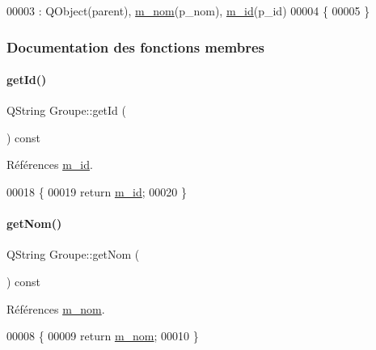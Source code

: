 \begin{DoxyCode}
00003                                                            : QObject(parent), 
      \hyperlink{class_groupe_ad76b271599f46c8a350f8afa3bc884c5}{m\_nom}(p\_nom), \hyperlink{class_groupe_ae837f3752cea27d8ab7678d4d1e4a764}{m\_id}(p\_id)
00004 \{
00005 \}
\end{DoxyCode}


\subsubsection{Documentation des fonctions membres}
\mbox{\label{class_groupe_aadab27e8d3f4a050a7bc4ae23c95efa7}} 
\paragraph{\texorpdfstring{get\+Id()}{getId()}}
{\footnotesize\ttfamily Q\+String Groupe\+::get\+Id (\begin{DoxyParamCaption}{ }\end{DoxyParamCaption}) const}



Références \hyperlink{class_groupe_ae837f3752cea27d8ab7678d4d1e4a764}{m\+\_\+id}.


\begin{DoxyCode}
00018 \{
00019     \textcolor{keywordflow}{return} \hyperlink{class_groupe_ae837f3752cea27d8ab7678d4d1e4a764}{m\_id};
00020 \}
\end{DoxyCode}
\mbox{\label{class_groupe_a88bf0b7a0e69d549fa3fdb1b01c0de2c}} 
\paragraph{\texorpdfstring{get\+Nom()}{getNom()}}
{\footnotesize\ttfamily Q\+String Groupe\+::get\+Nom (\begin{DoxyParamCaption}{ }\end{DoxyParamCaption}) const}



Références \hyperlink{class_groupe_ad76b271599f46c8a350f8afa3bc884c5}{m\+\_\+nom}.


\begin{DoxyCode}
00008 \{
00009     \textcolor{keywordflow}{return} \hyperlink{class_groupe_ad76b271599f46c8a350f8afa3bc884c5}{m\_nom};
00010 \}
\end{DoxyCode}
\mbox{\label{class_groupe_a8d2126449b6ea1be95bd6b34bf0b28f4}} 
